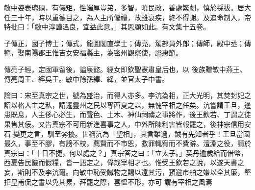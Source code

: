 \begin{pinyinscope}
 敏中姿表瑰碩，有儀矩，性端厚豈弟，多智，曉民政，善處繁劇，慎於採拔。居大任三十年，時以重德目之，為人主所優禮，故雖衰疾，終不得謝。及追命制入，帝特批曰：「敏中淳謹溫良，宜益此意。」其恩顧如此。有文集十五卷。



 子傳正，國子博士；傳式，龍圖閣直學士；傳亮，駕部員外郎；傳師，殿中丞；傳範，娶南陽郡王惟吉女安福縣主，為密州觀察使，謚惠節。



 傳亮子經，定國軍留後，謚康懿。經女即欽聖憲肅皇后也，以
 後族贈敏中燕王、傳亮周王、經吳王。敏中餘孫繹、絳，並官太子中書。



 論曰：宋至真宗之世，號為盛治，而得人亦多。李沆為相，正大光明，其焚封妃之詔以格人主之私，請遷靈州之民以奪西夏之謀，無愧宰相之任矣。沆嘗謂王旦，邊患既息，人主侈心必生，而聲色、土木、神仙祠禱之事將作，後王欽若、丁謂之徒果售其佞。又告真宗不可用新進喜事之人，中外所陳利害皆報罷之，後神宗信用安石
 變更之言，馴至棼擾。世稱沆為「聖相」，其言雖過，誠有先知者乎！王旦當國最久，事至不膠，有謗不校，薦賢而不市恩，救罪輒宥而不費辭。澶淵之役，請於真宗曰：「十日不捷，何以處之？」真宗答之曰：「立太子。」契丹逾歲給而借幣，西夏告民饑而假糧，皆一語定之，偉哉宰相才也。惟受王欽若之說，以遂天書之妄，斯則不及李沆爾。向敏中恥受贓物之賜以遠其污，預避市舶之嫌以全其廉，堅拒皇甫侃之書以免其累，拜罷之際，喜慍不形，亦可
 謂有宰相之風焉



\end{pinyinscope}